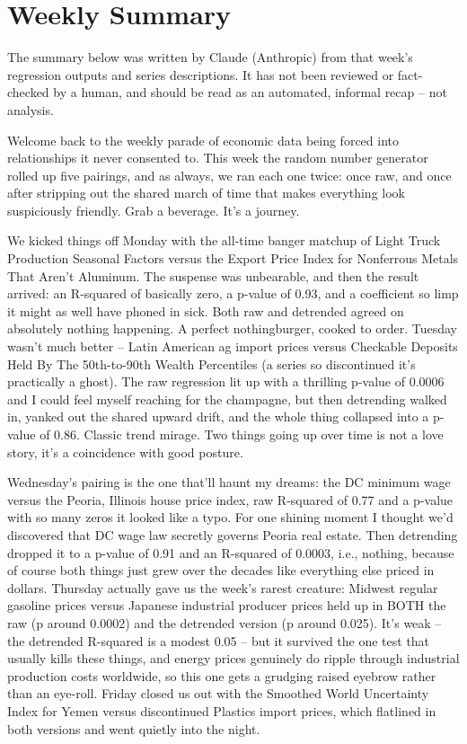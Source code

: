 \section{Weekly Summary}

\begin{tcolorbox}[colback=yellow!10,colframe=black!50,title=AI-Generated Content]
\noindent The summary below was written by Claude (Anthropic) from that week's regression outputs and series descriptions. It has not been reviewed or fact-checked by a human, and should be read as an automated, informal recap -- not analysis.
\end{tcolorbox}

Welcome back to the weekly parade of economic data being forced into relationships it never consented to. This week the random number generator rolled up five pairings, and as always, we ran each one twice: once raw, and once after stripping out the shared march of time that makes everything look suspiciously friendly. Grab a beverage. It's a journey.

We kicked things off Monday with the all-time banger matchup of Light Truck Production Seasonal Factors versus the Export Price Index for Nonferrous Metals That Aren't Aluminum. The suspense was unbearable, and then the result arrived: an R-squared of basically zero, a p-value of 0.93, and a coefficient so limp it might as well have phoned in sick. Both raw and detrended agreed on absolutely nothing happening. A perfect nothingburger, cooked to order. Tuesday wasn't much better -- Latin American ag import prices versus Checkable Deposits Held By The 50th-to-90th Wealth Percentiles (a series so discontinued it's practically a ghost). The raw regression lit up with a thrilling p-value of 0.0006 and I could feel myself reaching for the champagne, but then detrending walked in, yanked out the shared upward drift, and the whole thing collapsed into a p-value of 0.86. Classic trend mirage. Two things going up over time is not a love story, it's a coincidence with good posture.

Wednesday's pairing is the one that'll haunt my dreams: the DC minimum wage versus the Peoria, Illinois house price index, raw R-squared of 0.77 and a p-value with so many zeros it looked like a typo. For one shining moment I thought we'd discovered that DC wage law secretly governs Peoria real estate. Then detrending dropped it to a p-value of 0.91 and an R-squared of 0.0003, i.e., nothing, because of course both things just grew over the decades like everything else priced in dollars. Thursday actually gave us the week's rarest creature: Midwest regular gasoline prices versus Japanese industrial producer prices held up in BOTH the raw (p around 0.0002) and the detrended version (p around 0.025). It's weak -- the detrended R-squared is a modest 0.05 -- but it survived the one test that usually kills these things, and energy prices genuinely do ripple through industrial production costs worldwide, so this one gets a grudging raised eyebrow rather than an eye-roll. Friday closed us out with the Smoothed World Uncertainty Index for Yemen versus discontinued Plastics import prices, which flatlined in both versions and went quietly into the night.

